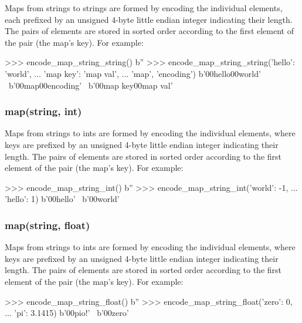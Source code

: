 Maps from strings to strings are formed by encoding the individual elements,
each prefixed by an unsigned 4-byte little endian integer indicating their
length.  The pairs of elements are stored in sorted order according to the first
element of the pair (the map's key).  For example:

\begin{pythoncode}
>>> encode_map_string_string({})
b''
>>> encode_map_string_string({'hello': 'world',
...                           'map key': 'map val',
...                           'map', 'encoding'})
b'\x00hello\x00world' \
b'\x00map\x00encoding' \
b'\x00map key\x00map val'
\end{pythoncode}

\subsubsection{map(string, int)}

Maps from strings to ints are formed by encoding the individual elements, where
keys are prefixed by an unsigned 4-byte little endian integer indicating their
length.  The pairs of elements are stored in sorted order according to the first
element of the pair (the map's key).  For example:

\begin{pythoncode}
>>> encode_map_string_int({})
b''
>>> encode_map_string_int({'world': -1,
...                        'hello': 1})
b'\x05hello\x01\x00\x00\x00\x00\x00' \
b'\x00world\xff\xff\xff\xff\xff\xff\xff\xff'
\end{pythoncode}

\subsubsection{map(string, float)}

Maps from strings to ints are formed by encoding the individual elements, where
keys are prefixed by an unsigned 4-byte little endian integer indicating their
length.  The pairs of elements are stored in sorted order according to the first
element of the pair (the map's key).  For example:

\begin{pythoncode}
>>> encode_map_string_float({})
b''
>>> encode_map_string_float({'zero': 0,
...                          'pi': 3.1415})
b'\x00pio\xca!\t@' \
b'\x00zero'
\end{pythoncode}


